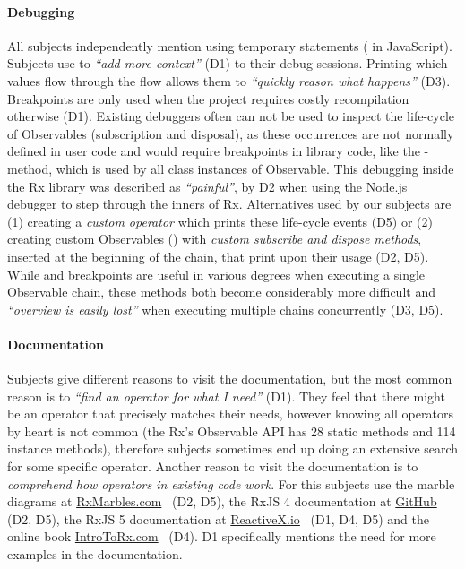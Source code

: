 \paragraph{Debugging} All subjects independently mention using temporary
\printfdebugging{} statements ( in JavaScript).
Subjects use \printfdebugging{} to \emph{``add more context''} (D1) to
their debug sessions.  Printing which values flow through the flow
allows them to \emph{``quickly reason what happens''} (D3).  Breakpoints
are only used when the project requires costly recompilation otherwise (D1).
Existing debuggers often can not be used to inspect the life-cycle of
Observables (subscription and disposal), as these occurrences are not
normally defined in user code and would require breakpoints in library
code, like the -method, which is used by all class
instances of Observable.  This debugging inside the Rx library was
described as \emph{``painful''}, by D2 when using the Node.js debugger
to step through the inners of Rx.  Alternatives used by our subjects are
(1) creating a \emph{custom  operator} which prints these
life-cycle events (D5) or (2) creating custom Observables ()
with \emph{custom subscribe and dispose methods}, inserted at the
beginning of the chain, that print upon their usage (D2, D5).  While
\printfdebugging{} and breakpoints are useful in various degrees when
executing a single Observable chain, these methods both become
considerably more difficult and \emph{``overview is easily lost''} when
executing multiple chains concurrently (D3, D5).

\paragraph{Documentation} Subjects give different reasons to visit the
documentation, but the most common reason is to \emph{``find an operator
for what I need''} (D1).  They feel that there might be an operator that
precisely matches their needs, however knowing all operators by heart is
not common (the Rx's Observable API has 28 static methods and 114
instance methods), therefore subjects sometimes end up doing an
extensive search for some specific operator.  Another reason to visit
the documentation is to \emph{comprehend how operators in existing code
work}.  For this subjects use the marble diagrams at \href{http://rxmarbles.com}
{RxMarbles.com}~\cite{rxmarbles} (D2, D5), the RxJS 4 documentation at
\href{https://github.com/Reactive-Extensions/RxJS/blob/master/doc/} {GitHub}
(D2, D5), the RxJS 5 documentation at \href{http://reactivex.io/rxjs} {ReactiveX.io}~\cite
{reactivex} (D1, D4, D5) and the online book \href{http://introtorx.com}
{IntroToRx.com}~\cite{introtorx} (D4).  D1 specifically mentions the
need for more examples in the documentation.

